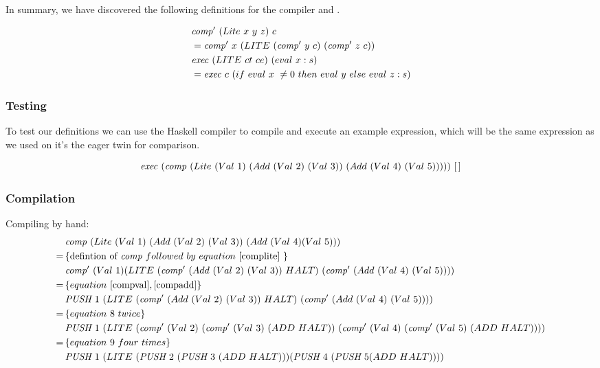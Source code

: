 \documentclass {article}
\begin{document}
In summary, we have discovered the following 
definitions for the compiler and \vm.

\begin{eqnarray}
&\mathit{comp'\ }  (Lite\ x\ y\ z)\ c \nonumber \\
	&= \mathit{comp'\ }  x\ (LITE\ (\mathit{comp'\ }  y\ c)\ (\mathit{comp'\ }  z\ c)) \label{complite} \\
&\mathit{exec\ } (LITE\ ct\ ce)\ (eval\ x:s) \nonumber \\
	&= \mathit{exec\ } c\ (if\ eval\ x\ \not= 0\ then\ eval\ y\ else\ eval\ z : s) \label{execlite}
\end{eqnarray}

\subsubsection{Testing}

To test our definitions we can use the Haskell compiler
to compile and execute an example \lite expression,
which will be the same expression as we used
on it's the eager twin for comparison.

\[ \Exec (\Comp (Lite\ (Val\ 1)\
		 (Add\ (Val\ 2)\ (Val\ 3))\ 
		(Add\ (Val\ 4)\ (Val\ 5)))))\ [\, ] \]

\subsubsection{Compilation}

Compiling by hand:
\begin{align*}	
&\Comp (Lite\ (Val\ 1)\ (Add\ (Val\ 2)\ (Val\ 3))\ (Add\ (Val\ 4) (Val\ 5))) \\
=\, & \{ \mbox{defintion of}\ \Comp followed\ by\ equation\ \ref{complite}\ \} \\
&\Compp  (Val\ 1) (LITE\ (\Compp  (Add\ (Val\ 2)\ (Val\ 3))\ HALT)\ (\Compp   (Add\ (Val\ 4)\ (Val\ 5)))) \\
=\, & \{ equation\ \ref{compval}, \ref{compadd} \} \\
&\PUSH 1\ (LITE\ (\Compp  (Add\ (Val\ 2)\ (Val\ 3))\ HALT)\ (\Compp  (Add\ (Val\ 4)\ (Val\ 5)))) \\
=\, & \{ equation\ 8\ twice \} \\
&\PUSH 1\ (LITE\ (\Compp  (Val\ 2)\ (\Compp  (Val\ 3)\ (ADD\ HALT))\ (\Compp   (Val\ 4)\ (\Compp  (Val\ 5)\ (ADD\ HALT)))) \\
=\, & \{ equation\ 9\ four\ times \} \\
&\PUSH 1\ (LITE\ (\PUSH 2\ (\PUSH 3\ (ADD\ HALT))) (\PUSH 4\ (\PUSH 5 (ADD\ HALT))))
\end{align*}
\end{document}
